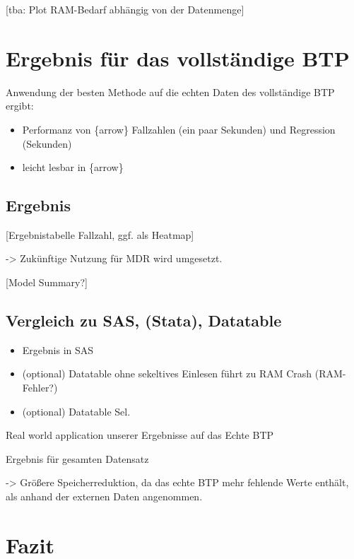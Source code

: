 \documentclass[
  german,
  10pt,
  twoside]{article}
\providecommand{\tightlist}{%
  \setlength{\itemsep}{0pt}\setlength{\parskip}{0pt}}
\begin{document}
{[}tba: Plot RAM-Bedarf abhängig von der Datenmenge{]}

\setcounter{subsection}{4}

\section{Ergebnis für das vollständige BTP}\label{sec-ergebnis}

Anwendung der besten Methode auf die echten Daten des vollständige BTP
ergibt:

\begin{itemize}
\tightlist
\item
  Performanz von \{arrow\} Fallzahlen (ein paar Sekunden) und Regression
  (Sekunden)
\item
  leicht lesbar in \{arrow\}
\end{itemize}

\subsection{Ergebnis}\label{ergebnis}

{[}Ergebnistabelle Fallzahl, ggf. als Heatmap{]}

-\textgreater{} Zukünftige Nutzung für MDR wird umgesetzt.

{[}Model Summary?{]}

\subsection{Vergleich zu SAS, (Stata),
Datatable}\label{vergleich-zu-sas-stata-datatable}

\begin{itemize}
\tightlist
\item
  Ergebnis in SAS
\item
  (optional) Datatable ohne sekeltives Einlesen führt zu RAM Crash
  (RAM-Fehler?)
\item
  (optional) Datatable Sel.
\end{itemize}

Real world application unserer Ergebnisse auf das Echte BTP

Ergebnis für gesamten Datensatz

-\textgreater{} Größere Speicherreduktion, da das echte BTP mehr
fehlende Werte enthält, als anhand der externen Daten angenommen.

\setcounter{subsection}{5}

\section{Fazit}\label{sec-ausblick}
\end{document}
